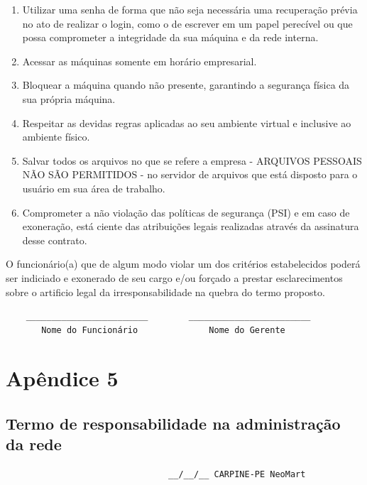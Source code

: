 \documentclass[12pt]{article}
\begin{document}
\begin{enumerate}
    \item Utilizar uma senha de forma que não seja necessária uma recuperação prévia no ato de realizar o login, como o de escrever em um papel perecível ou que possa comprometer a integridade da sua máquina e da rede interna.
    \item Acessar as máquinas somente em horário empresarial.
    \item Bloquear a máquina quando não presente, garantindo a segurança física da sua própria máquina.
    \item Respeitar as devidas regras aplicadas ao seu ambiente virtual e inclusive ao ambiente físico.
    \item Salvar todos os arquivos no que se refere a empresa - ARQUIVOS PESSOAIS NÃO SÃO PERMITIDOS - no servidor de arquivos que está disposto para o usuário em sua área de trabalho.
    \item Comprometer a não violação das políticas de segurança (PSI) e em caso de exoneração, está ciente das atribuições legais realizadas através da assinatura desse contrato.
\end{enumerate}

O funcionário(a) que de algum modo violar um dos critérios estabelecidos poderá ser indiciado e exonerado de seu cargo e/ou forçado a prestar esclarecimentos sobre o artificio legal da irresponsabilidade na quebra do termo proposto.
\newline
\newline
\begin{verbatim}
    ________________________        ________________________
       Nome do Funcionário              Nome do Gerente
\end{verbatim}

\newpage

\section{Apêndice 5}

\subsection{Termo de responsabilidade na administração da rede}

\begin{verbatim}
                                __/__/__ CARPINE-PE NeoMart
\end{verbatim}
\end{document}
